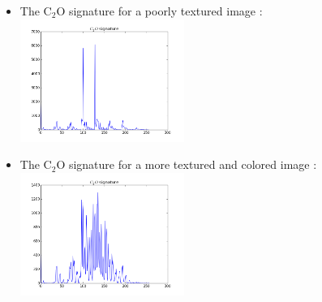 \documentclass[xcolor=table]{beamer}
\begin{document}
\begin{frame}
\begin{itemize}
\item<1-> The C$_2$O signature for a poorly textured image :
 {\includegraphics[height=4cm]{C2OSig61p.png}}
\item<2-> The C$_2$O signature for a more textured and colored image :
 {\includegraphics[height=4cm]{C2OSig97p.png}}

\end{itemize}




\end{frame}
\end{document}
